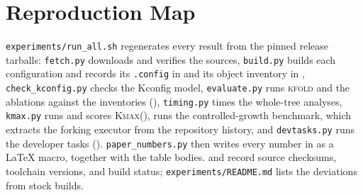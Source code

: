 \documentclass[acmsmall,screen,review]{acmart}
\newcommand{\tool}{\textsc{kfold}\xspace}
\newcommand{\kmax}{\textsc{Kmax}\xspace}
\begin{document}



\appendix
\section{Reproduction Map}
\label{app:reproduction}

\texttt{experiments/run\_all.sh} regenerates every result from the pinned release tarballs: \texttt{fetch.py} downloads and verifies the sources, \texttt{build.py} builds each configuration and records its \texttt{.config} in  and its object inventory in , \texttt{check\_kconfig.py} checks the Kconfig model, \texttt{evaluate.py} runs \tool and the ablations against the inventories (), \texttt{timing.py} times the whole-tree analyses, \texttt{kmax.py} runs and scores \kmax (),  runs the controlled-growth benchmark, which extracts the forking executor from the repository history, and \texttt{devtasks.py} runs the developer tasks (). \texttt{paper\_numbers.py} then writes every number in  as a \LaTeX{} macro, together with the table bodies.  and  record source checksums, toolchain versions, and build status; \texttt{experiments/README.md} lists the deviations from stock builds.
\end{document}
